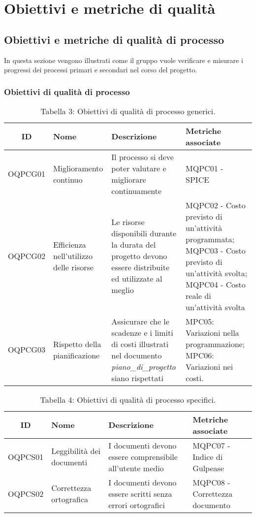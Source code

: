 \section{Obiettivi e metriche di qualità}
\subsection{Obiettivi e metriche di qualità di processo}
In questa sezione vengono illustrati come il gruppo vuole verificare e misurare i progressi dei processi primari e secondari nel corso del progetto.
\subsubsection{Obiettivi di qualità di processo}
\begin{table}[H]
	\centering
	\begin{tabularx}{\textwidth}{|c|X|X|X|}
	\hline
	\textbf{ID} & \textbf{Nome} & \textbf{Descrizione} & \textbf{Metriche associate}\\
	\hline
	OQPCG01 & Miglioramento continuo & Il processo si deve poter valutare e migliorare continuamente & MQPC01 - SPICE\\
	\hline
	OQPCG02 & Efficienza nell'utilizzo delle risorse & Le risorse disponibili durante la durata del progetto devono essere distribuite ed utilizzate al meglio & MQPC02 - Costo previsto di un'attività programmata; \hspace{25pt} MQPC03 - Costo previsto di un'attività svolta; MQPC04 - Costo reale di un'attività svolta \\
	\hline
	OQPCG03 & Rispetto della pianificazione & Assicurare che le scadenze e i limiti di costi illustrati nel documento \textit{piano\_di\_progetto} siano rispettati &  MPC05: Variazioni nella programmazione;\hspace{65pt} MPC06: Variazioni nei costi. \\
	\hline
	\end{tabularx}
	\caption{Tabella 3: Obiettivi di qualità di processo generici.}
\end{table}

\begin{table}[H]
	\centering
	\begin{tabularx}{\textwidth}{|c|X|X|X|}
		\hline
		\textbf{ID} & \textbf{Nome} & \textbf{Descrizione} & \textbf{Metriche associate}\\
		\hline
		OQPCS01 & Leggibilità dei documenti & I documenti devono essere comprensibile all'utente medio & MQPC07 - Indice di Gulpease\\
		\hline
		OQPCS02 & Correttezza ortografica & I documenti devono essere scritti senza errori ortografici & MQPC08 - Correttezza documento \\
		\hline
	\end{tabularx}
	\caption{Tabella 4: Obiettivi di qualità di processo specifici.}
\end{table}

